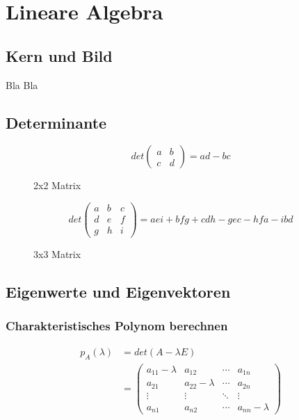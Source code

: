 
\section{Lineare Algebra}

\subsection{Kern und Bild}

Bla Bla

\subsection{Determinante}
\begin{figure}[H]
    \[
    det\begin{pmatrix}
    a & b \\
    c & d
    \end{pmatrix}
    = ad - bc
    \]
    \caption*{2x2 Matrix}
\end{figure}
\begin{figure}[H]
    \[
    det\begin{pmatrix}
    a & b & c \\
    d & e & f \\
    g & h & i
    \end{pmatrix}
    = aei + bfg + cdh - gec - hfa - ibd
    \]
    \caption*{3x3 Matrix}
\end{figure}


\subsection{Eigenwerte und Eigenvektoren}

\subsubsection{Charakteristisches Polynom berechnen}
\begin{equation}
    \begin{split}
    p_A(\lambda) & = det(A - \lambda E) \\
    & = \begin{pmatrix}
    a_{11} - \lambda & a_{12} & \cdots & a_{1n} \\
    a_{21} & a_{22} - \lambda & \cdots & a_{2n} \\
    \vdots & \vdots & \ddots & \vdots \\
    a_{n1} & a_{n2} & \cdots & a_{nn} - \lambda
    \end{pmatrix}
    \end{split}
\end{equation}

